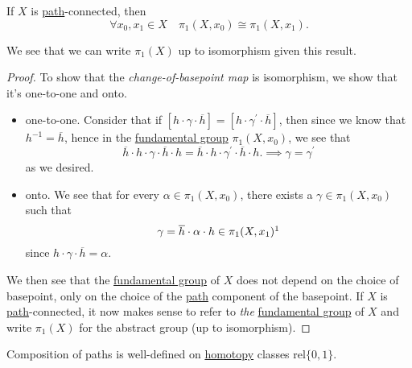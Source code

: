 \begin{theorem}\label{thm:lec8}
	If \(X\) is \hyperref[def:path]{path}-connected, then
	\[
		\forall x_0, x_1\in X\quad \pi_1(X, x_0)\cong \pi _1(X, x_1).
	\]
\end{theorem}
\begin{remark}
	We see that we can write \(\pi _1(X)\) up to isomorphism given this result.
\end{remark}
\begin{proof}
	\par To show that the \emph{change-of-basepoint map} is isomorphism, we show that it's one-to-one and onto.
	\begin{itemize}
		\item one-to-one. Consider that if \([h\cdot \gamma\cdot \overline{h} ] = [h\cdot \gamma ^\prime \cdot \overline{h} ]\), then since we know that \(h^{-1}  = \overline{h} \), hence
		      in the \hyperref[def:fundamental-group]{fundamental group} \(\pi _1(X, x_0)\), we see that
		      \[
			      \overline{h} \cdot h\cdot \gamma\cdot \overline{h} \cdot h = \overline{h} \cdot h\cdot \gamma ^\prime \cdot \overline{h} \cdot h. \implies \gamma = \gamma ^\prime
		      \]
		      as we desired.
		\item onto. We see that for every \(\alpha \in \pi_1(X, x_0)\), there exists a \(\gamma\in \pi_1(X, x_{0})\) such that
		      \[
			      \gamma = \overline{h} \cdot \alpha \cdot h\in \pi _1(X, x_1)\footnotemark
		      \]
		      since \(h\cdot \gamma\cdot \overline{h} =\alpha \).
	\end{itemize}

	\par We then see that the \hyperref[def:fundamental-group]{fundamental group} of \(X\) does not depend on the choice of basepoint, only on the choice of the \hyperref[def:path]{path} component of the basepoint.
	If \(X\) is \hyperref[def:path]{path}-connected, it now makes sense to refer to \emph{the} \hyperref[def:fundamental-group]{fundamental group} of \(X\) and write \(\pi _1(X)\) for the abstract group (up to isomorphism).
\end{proof}

\begin{exercise}
	Composition of paths is well-defined on \hyperref[def:homotopy]{homotopy} classes \hyperref[def:homotopy-relative]{\(\mathrm{rel} \{0, 1\}\)}.
\end{exercise}

